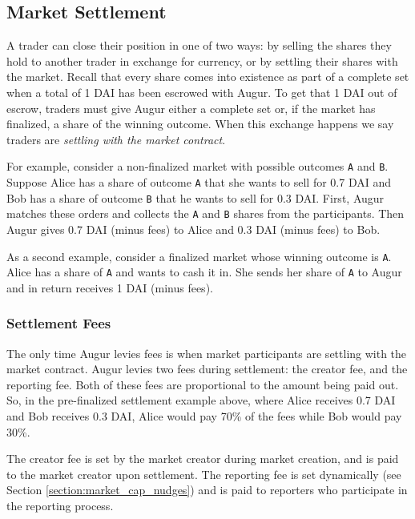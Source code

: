 \documentclass[floatfix,reprint,nofootinbib,amsmath,amssymb,epsfig,pre,floats,letterpaper,groupedaffiliation]{revtex4-1}
\theoremstyle{definition}
\theoremstyle{definition}
\begin{document}
\subsection{Market Settlement}\label{section:settlement}

A trader can close their position in one of two ways: by selling the shares they hold to another trader in exchange for currency, or by settling their shares with the market.  Recall that every share comes into existence as part of a complete set when a total of 1 DAI has been escrowed with Augur.  To get that 1 DAI out of escrow, traders must give Augur either a complete set or, if the market has finalized, a share of the winning outcome.  When this exchange happens we say traders are \textit{settling with the market contract}.

For example, consider a non-finalized market with possible outcomes \texttt{A} and \texttt{B}.  Suppose Alice has a share of outcome \texttt{A} that she wants to sell for 0.7 DAI and Bob has a share of outcome \texttt{B} that he wants to sell for 0.3 DAI. First, Augur matches these orders and collects the \texttt{A} and \texttt{B} shares from the participants. Then Augur gives 0.7 DAI (minus fees) to Alice and 0.3 DAI (minus fees) to Bob.

As a second example, consider a finalized market whose winning outcome is \texttt{A}.  Alice has a share of \texttt{A} and wants to cash it in.  She sends her share of \texttt{A} to Augur and in return receives 1 DAI (minus fees).

\subsubsection{Settlement Fees}

The only time Augur levies fees is when market participants are settling with the market contract.  Augur levies two fees during settlement: the creator fee, and the reporting fee. Both of these fees are proportional to the amount being paid out.  So, in the pre-finalized settlement example above, where Alice receives 0.7 DAI and Bob receives 0.3 DAI, Alice would pay 70\% of the fees while Bob would pay 30\%.

The creator fee is set by the market creator during market creation, and is paid to the market creator upon settlement.  The reporting fee is set dynamically (see Section \ref{section:market_cap_nudges}) and is paid to reporters who participate in the reporting process.
\end{document}
